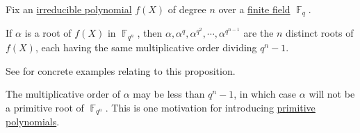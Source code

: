 \begin{proposition}\label{thm:irreducible_polynomial_over_finite_field}
  Fix an \hyperref[def:domain_divisibility/irreducible]{irreducible polynomial} \( f(X) \) of degree \( n \) over a \hyperref[def:finite_field]{finite field} \( \BbbF_q \).

  If \( \alpha \) is a root of \( f(X) \) in \( \BbbF_{q^n} \), then \( \alpha, \alpha^q, \alpha^{q^2}, \cdots, \alpha^{q^{n-1}} \) are the \( n \) distinct roots of \( f(X) \), each having the same multiplicative order dividing \( q^n - 1 \).
\end{proposition}
\begin{comments}
  \item See  for concrete examples relating to this proposition.
  \item The multiplicative order of \( \alpha \) may be less than \( q^n - 1 \), in which case \( \alpha \) will not be a primitive root of \( \BbbF_{q^n} \). This is one motivation for introducing \hyperref[def:finite_field_primitive_polynomial]{primitive polynomials}.
\end{comments}
